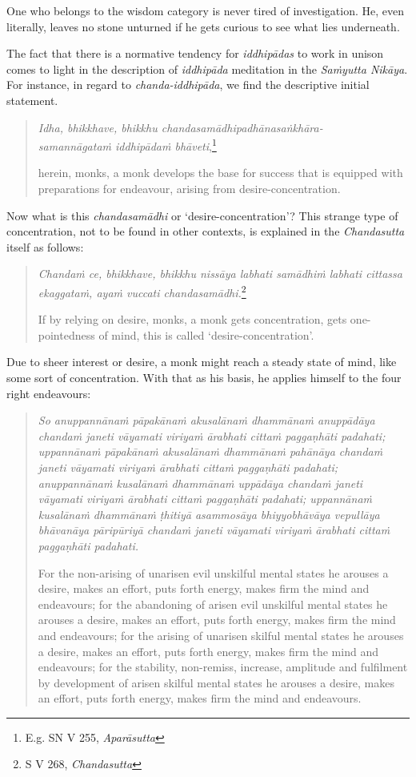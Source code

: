 One who belongs to the wisdom category is never tired of investigation. He, even literally, leaves no stone unturned if he gets curious to see what lies underneath.

The fact that there is a normative tendency for \emph{iddhipādas} to work in unison comes to light in the description of \emph{iddhipāda} meditation in the \emph{Saṁyutta Nikāya}. For instance, in regard to \emph{chanda-iddhipāda}, we find the descriptive initial statement.

\begin{quote}
\emph{Idha, bhikkhave, bhikkhu chandasamādhipadhānasaṅkhāra-\\ samannāgataṁ iddhipādaṁ bhāveti},\footnote{E.g. SN V 255, \emph{Aparāsutta}}

herein, monks, a monk develops the base for success that is equipped with preparations for endeavour, arising from desire-concentration.
\end{quote}

Now what is this \emph{chandasamādhi} or `desire-concentration'? This strange type of concentration, not to be found in other contexts, is explained in the \emph{Chandasutta} itself as follows:

\begin{quote}
\emph{Chandaṁ ce, bhikkhave, bhikkhu nissāya labhati samādhiṁ labhati cittassa ekaggataṁ, ayaṁ vuccati chandasamādhi.}\footnote{S V 268, \emph{Chandasutta}}

If by relying on desire, monks, a monk gets concentration, gets one-pointedness of mind, this is called `desire-concentration'.
\end{quote}

Due to sheer interest or desire, a monk might reach a steady state of mind, like some sort of concentration. With that as his basis, he applies himself to the four right endeavours:

\begin{quote}
\emph{So anuppannānaṁ pāpakānaṁ akusalānaṁ dhammānaṁ anuppādāya chandaṁ janeti vāyamati viriyaṁ ārabhati cittaṁ paggaṇhāti padahati; uppannānaṁ pāpakānaṁ akusalānaṁ dhammānaṁ pahānāya chandaṁ janeti vāyamati viriyaṁ ārabhati cittaṁ paggaṇhāti padahati; anuppannānaṁ kusalānaṁ dhammānaṁ uppādāya chandaṁ janeti vāyamati viriyaṁ ārabhati cittaṁ paggaṇhāti padahati; uppannānaṁ kusalānaṁ dhammānaṁ ṭhitiyā asammosāya bhiyyobhāvāya vepullāya bhāvanāya pāripūriyā chandaṁ janeti vāyamati viriyaṁ ārabhati cittaṁ paggaṇhāti padahati.}

For the non-arising of unarisen evil unskilful mental states he arouses a desire, makes an effort, puts forth energy, makes firm the mind and endeavours; for the abandoning of arisen evil unskilful mental states he arouses a desire, makes an effort, puts forth energy, makes firm the mind and endeavours; for the arising of unarisen skilful mental states he arouses a desire, makes an effort, puts forth energy, makes firm the mind and endeavours; for the stability, non-remiss, increase, amplitude and fulfilment by development of arisen skilful mental states he arouses a desire, makes an effort, puts forth energy, makes firm the mind and endeavours.
\end{quote}

